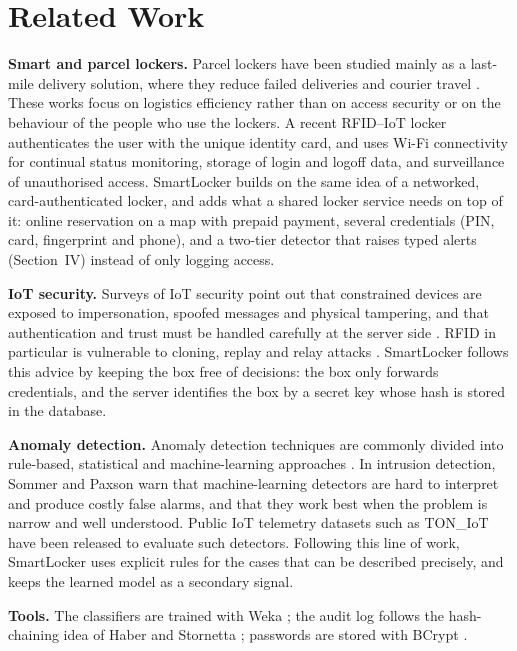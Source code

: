 \documentclass[conference, onecolumn]{IEEEtran}
\begin{document}
\section{Related Work}

\textbf{Smart and parcel lockers.} Parcel lockers have been studied mainly as a last-mile delivery solution, where they
reduce failed deliveries and courier travel \cite{iwan2016parcel}. These works focus on logistics efficiency rather
than on access security or on the behaviour of the people who use the lockers.
A recent RFID--IoT locker \cite{rfidiot2023locker} authenticates the user with the unique identity card, and uses Wi-Fi
connectivity for continual status monitoring, storage of login and logoff data, and surveillance of unauthorised
access. SmartLocker builds on the same idea of a networked, card-authenticated locker, and adds what a shared locker
service needs on top of it: online reservation on a map with prepaid payment, several credentials (PIN, card,
fingerprint and phone), and a two-tier detector that raises typed alerts (Section~IV) instead of only logging access.

\textbf{IoT security.} Surveys of IoT security point out that constrained devices are exposed to impersonation,
spoofed messages and physical tampering, and that authentication and trust must be handled carefully at the server
side \cite{sicari2015security}. RFID in particular is vulnerable to cloning, replay and relay attacks
\cite{mitrokotsa2010rfid}. SmartLocker follows this advice by keeping the box free of decisions: the box only forwards
credentials, and the server identifies the box by a secret key whose hash is stored in the database.

\textbf{Anomaly detection.} Anomaly detection techniques are commonly divided into rule-based, statistical and
machine-learning approaches \cite{chandola2009anomaly}. In intrusion detection, Sommer and Paxson
\cite{sommer2010outside} warn that machine-learning detectors are hard to interpret and produce costly false alarms,
and that they work best when the problem is narrow and well understood. Public IoT telemetry datasets such as TON\_IoT
\cite{moustafa2021toniot} have been released to evaluate such detectors. Following this line of work, SmartLocker uses
explicit rules for the cases that can be described precisely, and keeps the learned model as a secondary signal.

\textbf{Tools.} The classifiers are trained with Weka \cite{hall2009weka}; the audit log follows the hash-chaining idea
of Haber and Stornetta \cite{haber1991timestamp}; passwords are stored with BCrypt \cite{provos1999bcrypt}.
\end{document}
